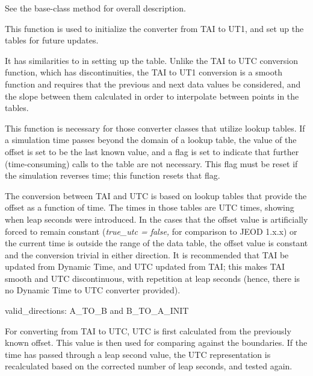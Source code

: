 {\begin{enumerate}
{\begin{enumerate}
See the base-class  method
for overall description.




This function is used to initialize the converter from TAI to UT1, and
set up the tables for future updates.

It has similarities to
 in
setting up the table.  Unlike the TAI to UTC conversion function, which
has discontinuities, the TAI to UT1 conversion is a smooth function and
requires that the previous and next data values be considered, and the
slope between them calculated in order to interpolate between points in
the tables.

This function is necessary for those converter classes that utilize
lookup tables.  If a simulation time passes beyond the domain of a
lookup table, the value of the offset is set to be the last known
value, and a flag is set to indicate that further (time-consuming)
calls to the table are not necessary.  This flag must be reset if the
simulation reverses time; this function resets that flag.

\end{enumerate}}

\label{ref:TimeConverterTAIUTC}

The conversion between TAI and UTC is based on lookup
tables that provide the offset as a function of time.  The times in
those tables are UTC times, showing when leap seconds were
introduced.  In the cases that the offset value is artificially forced
to remain constant (\textit{true\_utc = false,} for comparison to
JEOD 1.x.x) or the current time is outside the range of the data table,
the offset value is constant and the conversion trivial in either
direction.  It is recommended that TAI be updated from
 Dynamic Time, and UTC updated from TAI; this makes
TAI smooth and UTC discontinuous, with repetition at
leap seconds (hence, there is no Dynamic Time to UTC converter
provided).

{\begin{enumerate}
valid\_directions:
A\_TO\_B and B\_TO\_A\_INIT

For converting from TAI to UTC, UTC is first calculated from the
previously known offset.  This value is then used for comparing against
the boundaries.  If the time has passed through a leap second value,
the UTC representation is recalculated based on the corrected number of
leap seconds, and tested again.


\end{enumerate}}
\end{enumerate}}
